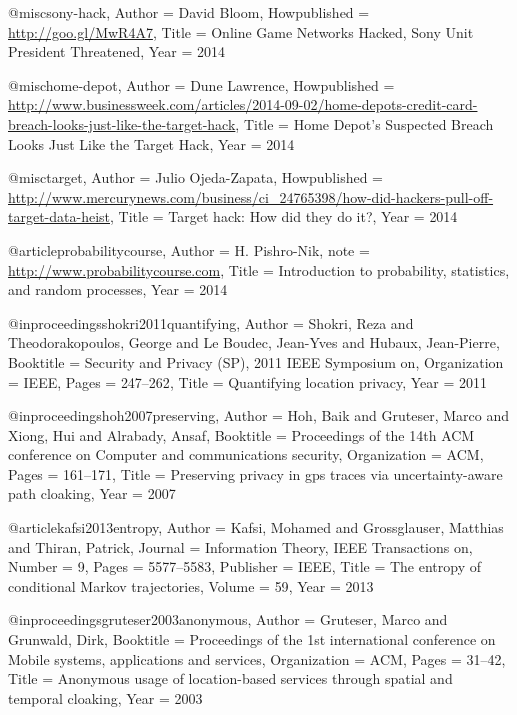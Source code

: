 {{{{{{{	@misc{sony-hack,
	Author = {David Bloom},
	Howpublished = {\url{http://goo.gl/MwR4A7}},
	Title = {{Online Game Networks Hacked, Sony Unit President Threatened}},
	Year = {2014}}
	
	@misc{home-depot,
	Author = {Dune Lawrence},
	Howpublished = {\url{http://www.businessweek.com/articles/2014-09-02/home-depots-credit-card-breach-looks-just-like-the-target-hack}},
	Title = {{Home Depot's Suspected Breach Looks Just Like the Target Hack}},
	Year = {2014}}
	
	@misc{target,
	Author = {Julio Ojeda-Zapata},
	Howpublished = {\url{http://www.mercurynews.com/business/ci_24765398/how-did-hackers-pull-off-target-data-heist}},
	Title = {{Target hack: How did they do it?}},
	Year = {2014}}
	
	
	@article{probabilitycourse,
	Author = {H. Pishro-Nik},
	note = {\url{http://www.probabilitycourse.com}},
	Title = {Introduction to probability, statistics, and random processes},
	Year = {2014}}
	
	
	
	@inproceedings{shokri2011quantifying,
	Author = {Shokri, Reza and Theodorakopoulos, George and Le Boudec, Jean-Yves and Hubaux, Jean-Pierre},
	Booktitle = {Security and Privacy (SP), 2011 IEEE Symposium on},
	Organization = {IEEE},
	Pages = {247--262},
	Title = {Quantifying location privacy},
	Year = {2011}}
	
	@inproceedings{hoh2007preserving,
	Author = {Hoh, Baik and Gruteser, Marco and Xiong, Hui and Alrabady, Ansaf},
	Booktitle = {Proceedings of the 14th ACM conference on Computer and communications security},
	Organization = {ACM},
	Pages = {161--171},
	Title = {Preserving privacy in gps traces via uncertainty-aware path cloaking},
	Year = {2007}}
	
	
	
	@article{kafsi2013entropy,
	Author = {Kafsi, Mohamed and Grossglauser, Matthias and Thiran, Patrick},
	Journal = {Information Theory, IEEE Transactions on},
	Number = {9},
	Pages = {5577--5583},
	Publisher = {IEEE},
	Title = {The entropy of conditional Markov trajectories},
	Volume = {59},
	Year = {2013}}
	
	@inproceedings{gruteser2003anonymous,
	Author = {Gruteser, Marco and Grunwald, Dirk},
	Booktitle = {Proceedings of the 1st international conference on Mobile systems, applications and services},
	Organization = {ACM},
	Pages = {31--42},
	Title = {Anonymous usage of location-based services through spatial and temporal cloaking},
	Year = {2003}}
	
}}}}}}}
